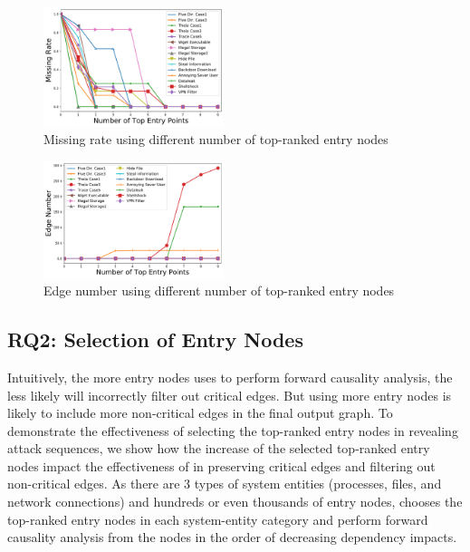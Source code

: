 % 
% 

\begin{figure}[t]
    \centering
    \includegraphics[width=0.47\textwidth]{figs/2021usenix/rq2missing.pdf}
    \caption{Missing rate using different number of top-ranked entry nodes}
    \label{fig:rq2missing}
\end{figure}
\begin{figure}[t]
    \centering
    \includegraphics[width=0.47\textwidth]{figs/2021usenix/rq2edgenumber.pdf}
    \caption{Edge number using different number of top-ranked entry nodes}
    \label{fig:rq2edge}
\end{figure}

\subsection{RQ2: Selection of Entry Nodes}
\label{subsec:rq2}
Intuitively, the more entry nodes \tool uses to perform forward causality analysis, the less likely \tool will incorrectly filter out critical edges.
But using more entry nodes is likely to include more non-critical edges in the final output graph.
To demonstrate the effectiveness of selecting the top-ranked entry nodes in revealing attack sequences, we show how the increase of the selected top-ranked entry nodes impact the effectiveness of \tool in preserving critical edges and filtering out non-critical edges.
As there are 3 types of system entities (\ie processes, files, and network connections) and hundreds or even thousands of entry nodes, \tool chooses the top-ranked entry nodes in each system-entity category and perform forward causality analysis from the nodes in the order of decreasing dependency impacts.

